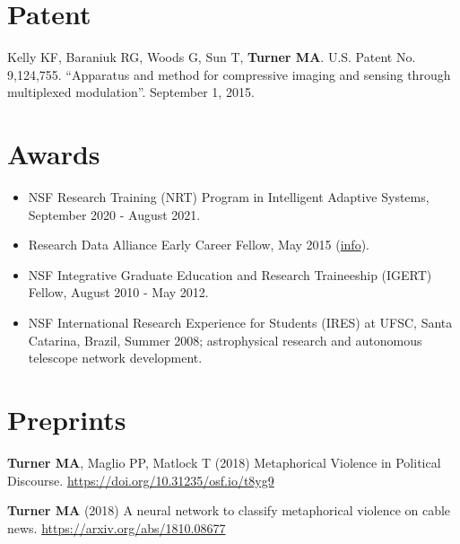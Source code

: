 \documentclass[letterpaper,11pt,oneside]{article}
\begin{document}
\noindent
\section*{\textcolor{gunmetal}{Patent}}

  \begin{hangparas}{0.25in}{1}
  Kelly KF, Baraniuk RG, Woods G, Sun T, \textbf{Turner MA}. U.S. Patent No. 9,124,755. 
  ``Apparatus and method for compressive imaging and sensing through multiplexed modulation''.
  September 1, 2015.

    
  \end{hangparas}


\noindent
\section*{\textcolor{gunmetal}{Awards}}
\begin{itemize}
  \item NSF Research Training (NRT) Program in Intelligent Adaptive Systems, September 2020 - August 2021.
  \item Research Data Alliance Early Career Fellow, May 2015
    (\href{https://rd-alliance.org/rda_us data share program}{info}).
  \item NSF Integrative Graduate Education and Research Traineeship (IGERT) Fellow, August 2010 - May 2012.
  \item NSF International Research Experience for Students (IRES) at UFSC,
    Santa Catarina, Brazil, Summer 2008;
    astrophysical research and autonomous telescope network development.
\end{itemize}

\noindent
\section*{\textcolor{gunmetal}{Preprints}}
\begin{hangparas}{0.25in}{1}

  \textbf{Turner MA}, Maglio PP, Matlock T (2018) Metaphorical Violence in Political Discourse. \url{https://doi.org/10.31235/osf.io/t8yg9}

  \textbf{Turner MA} (2018) A neural network to classify metaphorical violence on cable news. \url{https://arxiv.org/abs/1810.08677}

\end{hangparas}
\end{document}
